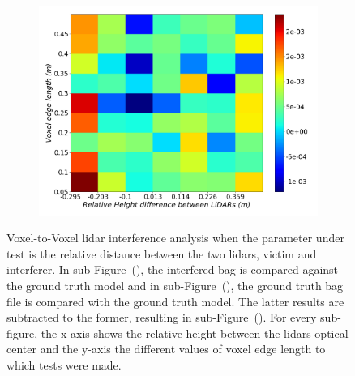 \begin{figure}[!ht]
\begin{subfigure}[c]{0.45\textwidth}
	\label{fig:height:octree-ground-truth-color-mesh}
\end{subfigure}
\\ \vspace{4mm}
\begin{subfigure}[c]{0.6\textwidth}
	\includegraphics[width=\textwidth]{img/lidar-interference/height/octree_difference_color_mesh.png}
\caption{}%
	\label{fig:height:octree-difference-color-mesh}
\end{subfigure}

\caption[Voxel-to-Voxel analysis when the height between the \acp{lidar} is variated.]{Voxel-to-Voxel \ac{lidar} interference analysis when the parameter under test is the relative distance between the two \acp{lidar}, victim and interferer. In sub-Figure~(), the interfered bag is compared against the ground truth model and in sub-Figure~(), the ground truth bag file is compared with the ground truth model. The latter results are subtracted to the former, resulting in sub-Figure~(). For every sub-figure, the x-axis shows the relative height between the \acp{lidar} optical center and the y-axis the different values of voxel edge length to which tests were made.}
\label{fig:height:octree-color-mesh}
\end{figure}

